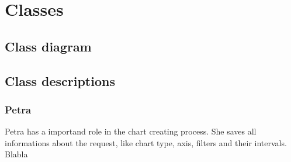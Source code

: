 \section{Classes}

\subsection{Class diagram}

\subsection{Class descriptions}


\subsubsection*{Petra}
Petra has a importand role in the chart creating process. She saves all informations about the request,
like chart type, axis, filters and their intervals. Blabla
